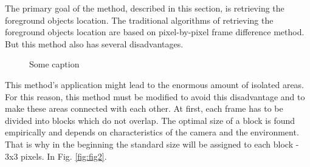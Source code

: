 \documentclass[12pt,a4paper,oneside,titlepage]{article}
\begin{document}



The primary goal of the method, described in this section, is retrieving the foreground objects location.
The traditional algorithms of retrieving the foreground objects location are based on pixel-by-pixel frame difference method.
But this method also has several disadvantages.

\begin{figure}[h]
  \caption{Some caption}
  \label{fig:fig1}
\end{figure}


This method's application might lead to the  enormous amount of isolated areas.
For this reason, this method must be modified to avoid this disadvantage and to make these areas connected with each other.
At first, each frame has to be divided into blocks which do not overlap.
The optimal size of a block is found empirically and depends on characteristics of the camera and the environment.
That is why in the beginning the standard size will be assigned to each block - 3x3 pixels.
In Fig. \ref{fig:fig2}.
\end{document}
